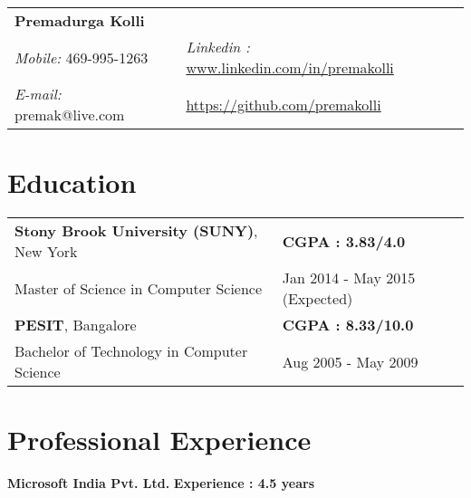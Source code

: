 \documentclass[margin,line,10.5pt]{res}
\begin{document}
\begin{tabular}{@{}p{4.3in}p{4in}}
{\bf \Large Premadurga Kolli}  &   \\
{\it Mobile:}    469-995-1263 & {\it Linkedin :} \hspace{0.01in}\url{www.linkedin.com/in/premakolli}   \\
{\it E-mail:}  premak@live.com &  \hspace{0.12in}{\it Github \hspace{0.002in}:}  \hspace{0.05in}\url{https://github.com/premakolli} \\
\end{tabular}
\begin{resume}

\section{\sc Education}

\begin{tabular}{@{}p{4.3in}p{4in}}
{\bf Stony Brook University (SUNY)}, New York  &   \hspace{0.8cm} {\bf CGPA : 3.83/4.0}\\
Master of Science in Computer Science & \hspace{-1.1cm}Jan 2014 - May 2015 (Expected)   \\
\rule{0pt}{3ex}{\bf PESIT}, Bangalore &  \hspace{0.6cm} {\bf CGPA : 8.33/10.0} \\
Bachelor of Technology in Computer Science & \hspace{0.5cm} Aug 2005 - May 2009
\end{tabular}

\vspace{-.15cm}

\section{\sc Professional Experience}
{\bf Microsoft India Pvt. Ltd.} \hspace{2.6in} {\bf Experience : 4.5 years}
\vspace{-.8cm}


\end{resume}
\end{document}
